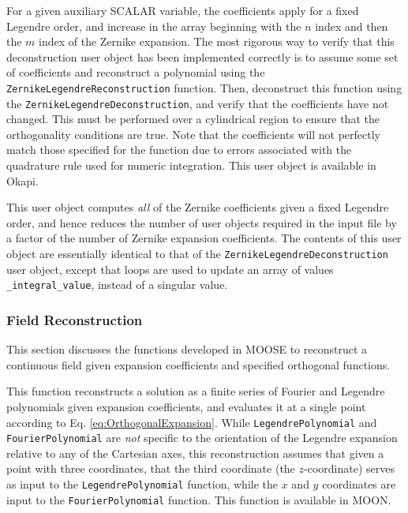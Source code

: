 \documentclass[10pt]{article}
\newcounter{subsubsubsection}[subsubsection]
\numberwithin{equation}{section} %
\begin{document}
For a given auxiliary SCALAR variable, the coefficients apply for a fixed Legendre order, and increase in the array beginning with the \(n\) index and then the \(m\) index of the Zernike expansion. The most rigorous way to verify that this deconstruction user object has been implemented correctly is to assume some set of coefficients and reconstruct a polynomial using the {\tt ZernikeLegendreReconstruction} function. Then, deconstruct this function using the {\tt ZernikeLegendreDeconstruction}, and verify that the coefficients have not changed. This must be performed over a cylindrical region to ensure that the orthogonality conditions are true. Note that the coefficients will not perfectly match those specified for the function due to errors associated with the quadrature rule used for numeric integration. This user object is available in Okapi.

This user object computes {\it all} of the Zernike coefficients given a fixed Legendre order, and hence reduces the number of user objects required in the input file by a factor of the number of Zernike expansion coefficients. The contents of this user object are essentially identical to that of the {\tt ZernikeLegendreDeconstruction} user object, except that loops are used to update an array of values {\tt \_integral\_value}, instead of a singular value.

\subsubsection{Field Reconstruction}
This section discusses the functions developed in MOOSE to reconstruct a continuous field given expansion coefficients and specified orthogonal functions.

This function reconstructs a solution as a finite series of Fourier and Legendre polynomials given expansion coefficients, and evaluates it at a single point according to Eq. \eqref{eq:OrthogonalExpansion}. While {\tt LegendrePolynomial} and {\tt FourierPolynomial} are {\it not} specific to the orientation of the Legendre expansion relative to any of the Cartesian axes, this reconstruction assumes that given a point with three coordinates, that the third coordinate (the \(z\)-coordinate) serves as input to the {\tt LegendrePolynomial} function, while the \(x\) and \(y\) coordinates are input to the {\tt FourierPolynomial} function. This function is available in MOON.
\end{document}
